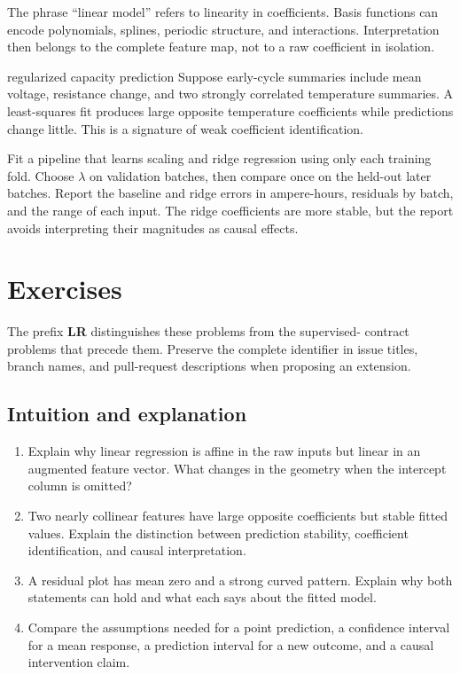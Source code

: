 The phrase ``linear model'' refers to linearity in coefficients. Basis
functions can encode polynomials, splines, periodic structure, and interactions.
Interpretation then belongs to the complete feature map, not to a raw
coefficient in isolation.

\begin{workedexample}{regularized capacity prediction}
Suppose early-cycle summaries include mean voltage, resistance change, and two
strongly correlated temperature summaries. A least-squares fit produces large
opposite temperature coefficients while predictions change little. This is a
signature of weak coefficient identification.

Fit a pipeline that learns scaling and ridge regression using only each
training fold. Choose $\lambda$ on validation batches, then compare once on the
held-out later batches. Report the baseline and ridge errors in ampere-hours,
residuals by batch, and the range of each input. The ridge coefficients are more
stable, but the report avoids interpreting their magnitudes as causal effects.
\end{workedexample}

\section{Exercises}

The prefix \textbf{LR} distinguishes these problems from the supervised-
contract problems that precede them. Preserve the complete identifier in issue
titles, branch names, and pull-request descriptions when proposing an extension.

\subsection*{Intuition and explanation}

\begin{enumerate}[label=\textbf{LR-I\arabic*.},leftmargin=*,itemsep=0.65em]
  \item Explain why linear regression is affine in the raw inputs but linear in
  an augmented feature vector. What changes in the geometry when the intercept
  column is omitted?
  \item Two nearly collinear features have large opposite coefficients but
  stable fitted values. Explain the distinction between prediction stability,
  coefficient identification, and causal interpretation.
  \item A residual plot has mean zero and a strong curved pattern. Explain why
  both statements can hold and what each says about the fitted model.
  \item Compare the assumptions needed for a point prediction, a confidence
  interval for a mean response, a prediction interval for a new outcome, and a
  causal intervention claim.
\end{enumerate}

